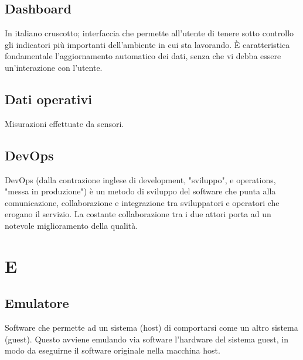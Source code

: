 \subsection*{Dashboard}
In italiano cruscotto; interfaccia che permette all'utente di tenere sotto controllo gli indicatori più importanti dell'ambiente in cui sta lavorando. È caratteristica fondamentale l'aggiornamento automatico dei dati, senza che vi debba essere un'interazione con l'utente.

\subsection*{Dati operativi}
Misurazioni effettuate da sensori.


\subsection*{DevOps}
DevOps (dalla contrazione inglese di development, "sviluppo", e operations, "messa in produzione") è un metodo di sviluppo del software che punta alla comunicazione, collaborazione e integrazione tra sviluppatori e operatori che erogano il servizio. La costante collaborazione tra i due attori porta ad un notevole miglioramento della qualità.

\clearpage
\section*{E}

\subsection*{Emulatore}
Software che permette ad un sistema (host) di comportarsi come un altro sistema (guest).
Questo avviene emulando via software l'hardware del sistema guest, in modo da eseguirne il software originale nella macchina host.


